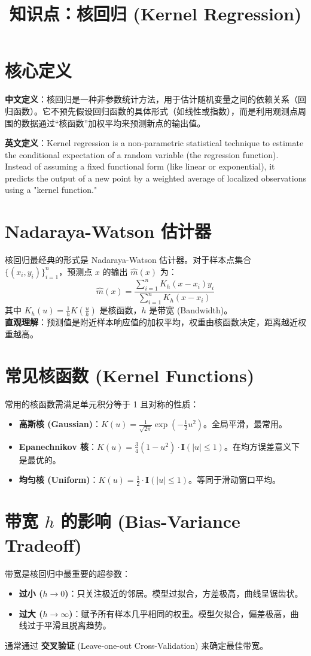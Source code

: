 \documentclass[12pt, a4paper]{article}
\title{知识点：核回归 (Kernel Regression)}
\author{}
\date{}
\begin{document}
\maketitle

\section{核心定义}
\textbf{中文定义}：核回归是一种非参数统计方法，用于估计随机变量之间的依赖关系（回归函数）。它不预先假设回归函数的具体形式（如线性或指数），而是利用观测点周围的数据通过“核函数”加权平均来预测新点的输出值。

\textbf{英文定义}：Kernel regression is a non-parametric statistical technique to estimate the conditional expectation of a random variable (the regression function). Instead of assuming a fixed functional form (like linear or exponential), it predicts the output of a new point by a weighted average of localized observations using a "kernel function."

\section{Nadaraya-Watson 估计器}
核回归最经典的形式是 Nadaraya-Watson 估计器。对于样本点集合 $\{(x_i, y_i)\}_{i=1}^n$，预测点 $x$ 的输出 $\hat{m}(x)$ 为：
$$ \hat{m}(x) = \frac{\sum_{i=1}^n K_h(x - x_i) y_i}{\sum_{i=1}^n K_h(x - x_i)} $$
其中 $K_h(u) = \frac{1}{h} K(\frac{u}{h})$ 是核函数，$h$ 是带宽 (Bandwidth)。
\\ \textbf{直观理解}：预测值是附近样本响应值的加权平均，权重由核函数决定，距离越近权重越高。

\section{常见核函数 (Kernel Functions)}
常用的核函数需满足单元积分等于 1 且对称的性质：
\begin{itemize}
    \item \textbf{高斯核 (Gaussian)}：$K(u) = \frac{1}{\sqrt{2\pi}} \exp(-\frac{1}{2}u^2)$。全局平滑，最常用。
    \item \textbf{Epanechnikov 核}：$K(u) = \frac{3}{4}(1-u^2) \cdot \mathbf{I}(|u| \le 1)$。在均方误差意义下是最优的。
    \item \textbf{均匀核 (Uniform)}：$K(u) = \frac{1}{2} \cdot \mathbf{I}(|u| \le 1)$。等同于滑动窗口平均。
\end{itemize}

\section{带宽 $h$ 的影响 (Bias-Variance Tradeoff)}
带宽是核回归中最重要的超参数：
\begin{itemize}
    \item \textbf{过小 ($h \to 0$)}：只关注极近的邻居。模型过拟合，方差极高，曲线呈锯齿状。
    \item \textbf{过大 ($h \to \infty$)}：赋予所有样本几乎相同的权重。模型欠拟合，偏差极高，曲线过于平滑且脱离趋势。
\end{itemize}
通常通过 \textbf{交叉验证} (Leave-one-out Cross-Validation) 来确定最佳带宽。
\end{document}
